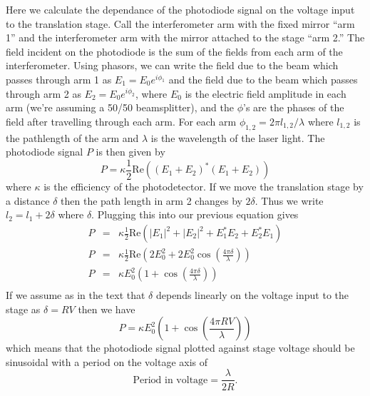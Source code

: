 \documentclass{report}
\begin{document}
Here we calculate the dependance of the photodiode signal on the voltage input to the translation stage. Call the interferometer arm with the fixed mirror ``arm 1'' and the interferometer arm with the mirror attached to the stage ``arm 2.'' The field incident on the photodiode is the sum of the fields from each arm of the interferometer. Using phasors, we can write the field due to the beam which passes through arm 1 as $E_1 = E_0 e^{i\phi_1}$ and the field due to the beam which passes through arm 2 as $E_2=E_0 e^{i\phi_2}$, where $E_0$ is the electric field amplitude in each arm (we're assuming a 50/50 beamsplitter), and the $\phi$'s are the phases of the field after travelling through each arm. For each arm $\phi_{1,2} = 2\pi l_{1,2} / \lambda$ where $l_{1,2}$ is the pathlength of the arm and $\lambda$ is the wavelength of the laser light. The photodiode signal $P$ is then given by
\begin{displaymath}
P = \kappa \frac{1}{2} \textrm{Re}((E_1+E_2)^{*}(E_1+E_2))
\end{displaymath}
where $\kappa$ is the efficiency of the photodetector. If we move the translation stage by a distance $\delta$ then the path length in arm 2 changes by $2\delta$. Thus we write $l_2 = l_1 + 2\delta$ where $\delta$. Plugging this into our previous equation gives
\begin{eqnarray*}
P &=& \kappa \frac{1}{2} \textrm{Re}(|E_1|^2+|E_2|^2+E_1^*E_2+E_2^*E_1) \\
P &=& \kappa \frac{1}{2} \textrm{Re}(2E_0^2+2E_0^2 \cos (\frac{4\pi \delta}{\lambda})) \\
P &=& \kappa E_0^2 (1 + \cos (\frac{4\pi \delta}{\lambda})) \\
\end{eqnarray*}
If we assume as in the text that $\delta$ depends linearly on the voltage input to the stage as $\delta = RV$ then we have
\begin{displaymath}
P = \kappa E_0^2 (1 + \cos (\frac{4\pi R V}{\lambda}))
\end{displaymath}
which means that the photodiode signal plotted against stage voltage should be sinusoidal with a period on the voltage axis of
\begin{displaymath}
\textrm{Period in voltage} = \frac{\lambda}{2R}.
\end{displaymath}
\end{document}
